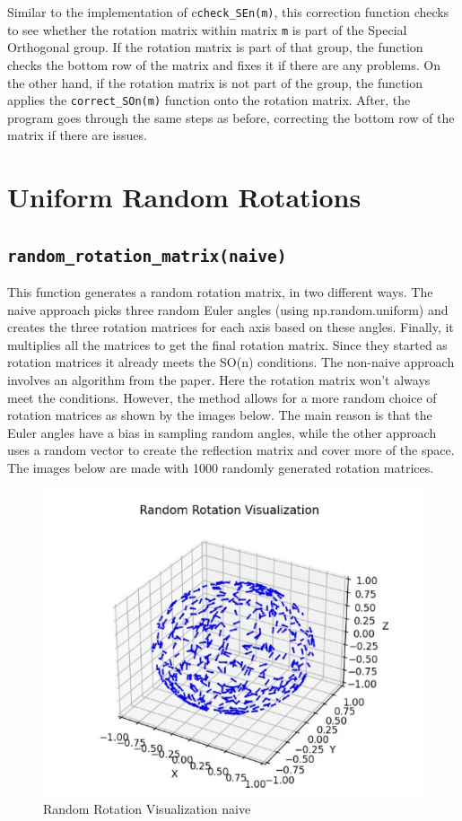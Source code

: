 \documentclass{article}
\begin{document}
Similar to the implementation of c\texttt{check\_SEn(m)}, this correction function checks to see whether the rotation matrix within matrix \texttt{m} is part of the Special Orthogonal group. If the rotation matrix is part of that group, the function checks the bottom row of the matrix and fixes it if there are any problems. On the other hand, if the rotation matrix is not part of the group, the function applies the \texttt{correct\_SOn(m)} function onto the rotation matrix. After, the program goes through the same steps as before, correcting the bottom row of the matrix if there are issues.

\section{Uniform Random Rotations}

\subsection{\texttt{random\_rotation\_matrix(naive)}}

This function generates a random rotation matrix, in two different ways. The naive approach picks three random Euler angles (using np.random.uniform) and creates the three rotation matrices for each axis based on these angles. Finally, it multiplies all the matrices to get the final rotation matrix. Since they started as rotation matrices it already meets the SO(n) conditions. The non-naive approach involves an algorithm from the paper. Here the rotation matrix won't always meet the conditions. However, the method allows for a more random choice of rotation matrices as shown by the images below. The main reason is that the Euler angles have a bias in sampling random angles, while the other approach uses a random vector to create the reflection matrix and cover more of the space. The images below are made with 1000 randomly generated rotation matrices.

\begin{figure} [H]
    \centering
    \includegraphics[width=0.5\linewidth]{latex_media/Random Rotation Visualization naive.jpg}
    \caption{Random Rotation Visualization naive}
    \label{fig:1}
\end{figure}
\end{document}
